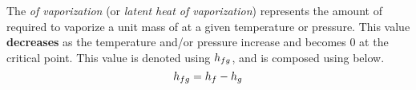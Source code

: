 \begin{definition}\label{def:Enthalpy_Vaporization}
  The \emph{ of vaporization} (or \emph{latent heat of vaporization}) represents the amount of  required to vaporize a unit mass of  at a given temperature or pressure.
  This value \textbf{decreases} as the temperature and/or pressure increase and becomes $0$ at the critical point.
  This value is denoted using $h_{fg}$, and is composed using  below.
  \begin{equation}\label{eq:Enthalpy_Vaporization}
    h_{fg} = h_{f} - h_{g}
  \end{equation}
\end{definition}





